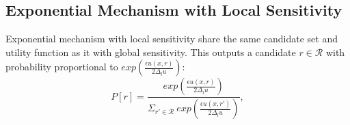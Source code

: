 


\subsection{Exponential Mechanism with Local Sensitivity}
\label{subsec_emls}
Exponential mechanism with local sensitivity share the same candidate set and utility function as it with global sensitivity. This outputs a candidate $r \in \mathcal{R}$ with probability proportional to $exp(\frac{\epsilon u(x,r)}{2 \Delta_{l}u})$:
\begin{equation*}
P[r] = \frac
{exp(\frac{\epsilon u(x,r)}{2 \Delta_{l}u})}
{\Sigma_{r' \in \mathcal{R}}\ exp(\frac{\epsilon u(x,r')}{2 \Delta_{l}u})},
\end{equation*}

